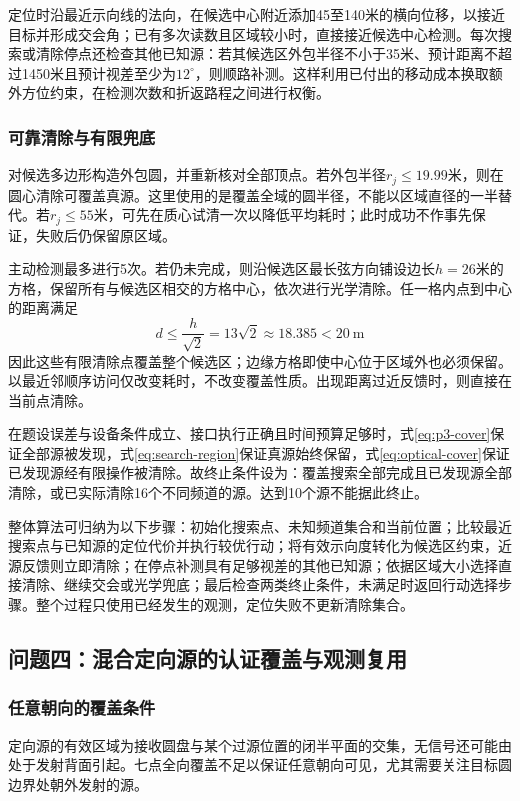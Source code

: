 \documentclass{JXUSTmodeling}
\begin{document}
定位时沿最近示向线的法向，在候选中心附近添加45至140米的横向位移，以接近目标并形成交会角；已有多次读数且区域较小时，直接接近候选中心检测。每次搜索或清除停点还检查其他已知源：若其候选区外包半径不小于35米、预计距离不超过1450米且预计视差至少为$12^\circ$，则顺路补测。这样利用已付出的移动成本换取额外方位约束，在检测次数和折返路程之间进行权衡。

\subsubsection{可靠清除与有限兜底}
对候选多边形构造外包圆，并重新核对全部顶点。若外包半径$r_j\le19.99$米，则在圆心清除可覆盖真源。这里使用的是覆盖全域的圆半径，不能以区域直径的一半替代。若$r_j\le55$米，可先在质心试清一次以降低平均耗时；此时成功不作事先保证，失败后仍保留原区域。

主动检测最多进行5次。若仍未完成，则沿候选区最长弦方向铺设边长$h=26$米的方格，保留所有与候选区相交的方格中心，依次进行光学清除。任一格内点到中心的距离满足
\begin{equation}
 d\le\frac{h}{\sqrt2}=13\sqrt2\approx18.385<20\ \mathrm{m}
 \label{eq:optical-cover}
\end{equation}
因此这些有限清除点覆盖整个候选区；边缘方格即使中心位于区域外也必须保留。以最近邻顺序访问仅改变耗时，不改变覆盖性质。出现距离过近反馈时，则直接在当前点清除。

在题设误差与设备条件成立、接口执行正确且时间预算足够时，式\eqref{eq:p3-cover}保证全部源被发现，式\eqref{eq:search-region}保证真源始终保留，式\eqref{eq:optical-cover}保证已发现源经有限操作被清除。故终止条件设为：覆盖搜索全部完成且已发现源全部清除，或已实际清除16个不同频道的源。达到10个源不能据此终止。

整体算法可归纳为以下步骤：初始化搜索点、未知频道集合和当前位置；比较最近搜索点与已知源的定位代价并执行较优行动；将有效示向度转化为候选区约束，近源反馈则立即清除；在停点补测具有足够视差的其他已知源；依据区域大小选择直接清除、继续交会或光学兜底；最后检查两类终止条件，未满足时返回行动选择步骤。整个过程只使用已经发生的观测，定位失败不更新清除集合。

\subsection{问题四：混合定向源的认证覆盖与观测复用}
\label{sub:model-p4}

\subsubsection{任意朝向的覆盖条件}
定向源的有效区域为接收圆盘与某个过源位置的闭半平面的交集，无信号还可能由处于发射背面引起。七点全向覆盖不足以保证任意朝向可见，尤其需要关注目标圆边界处朝外发射的源。
\end{document}
